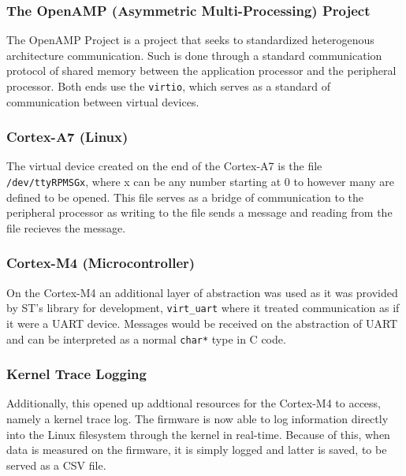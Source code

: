 \documentclass[12pt]{article}
\begin{document}
\subsubsection{The OpenAMP (Asymmetric Multi-Processing) Project}
The OpenAMP Project is a project that seeks to standardized heterogenous architecture communication. Such
is done through a standard communication protocol of shared memory between the application processor 
and the peripheral processor. Both ends use the \verb+virtio+, which serves as a standard of communication between
virtual devices.

\subsubsection{Cortex-A7 (Linux)}
The virtual device created on the end of the Cortex-A7 is the file \verb+/dev/ttyRPMSGx+, where x
can be any number starting at 0 to however many are defined to be opened. This file serves as a bridge of
communication to the peripheral processor as writing to the file sends a message and reading from the file
recieves the message. 

\subsubsection{Cortex-M4 (Microcontroller)}
On the Cortex-M4 an additional layer of abstraction was used as it was provided by 
ST's library for development, \verb+virt_uart+ where it treated communication as if it were a UART
device. Messages would be received on the abstraction of UART and can be interpreted as a normal \verb+char*+
type in C code. 

\subsubsection{Kernel Trace Logging}
Additionally, this opened up addtional resources for the Cortex-M4 to access, namely a kernel trace log.
The firmware is now able to log information directly into the Linux filesystem through the kernel in real-time.
Because of this, when data is measured on the firmware, it is simply logged and latter is saved, to be served as 
a CSV file.
\end{document}
